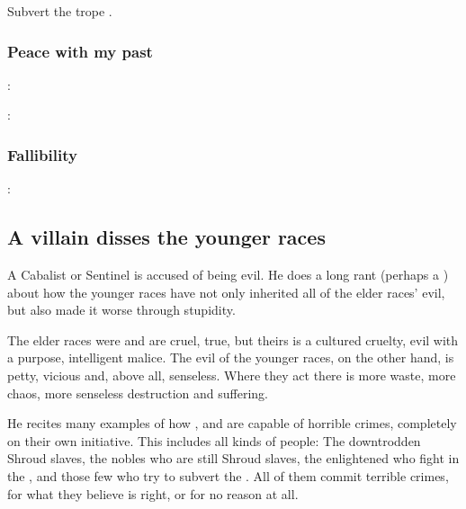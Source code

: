 \begin{garbage}
Subvert the trope .





\subsubsection{Peace with my past}
\Ishnaruchaefir: 

\Criseis: 





\subsubsection{Fallibility}
\Ishnaruchaefir: 







\subsection{A villain disses the younger races}
A Cabalist or Sentinel is accused of being evil. He does a long rant (perhaps a ) about how the younger races have not only inherited all of the elder races' evil, but also made it worse through stupidity. 

The elder races were and are cruel, true, but theirs is a cultured cruelty, evil with a purpose, intelligent malice. The evil of the younger races, on the other hand, is petty, vicious and, above all, senseless. Where they act there is more waste, more chaos, more senseless destruction and suffering. 

He recites many examples of how \humans{}, \scathae{} and \meccara{} are capable of horrible crimes, completely on their own initiative. This includes all kinds of people: The downtrodden Shroud slaves, the nobles who are still Shroud slaves, the enlightened who fight in the \secretwar, and those few who try to subvert the \secretwar. All of them commit terrible crimes, for what they believe is right, or for no reason at all.








\end{garbage}

